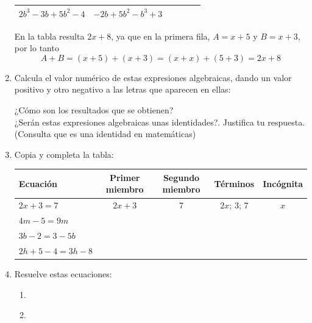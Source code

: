 \documentclass[10pt,twoside]{article}
\begin{document}
\begin{enumerate}
\begin{center}
\begin{tabular}{|l|l|c|c|c|c|}
\hline 
$2b^{3}-3b+5b^{2}-4$ & $-2b+5b^{2}-b^{3}+3$ &  &  &  &  \\ 
\hline 
\end{tabular} 
\end{center}
En la tabla resulta $2x+8$, ya que en la primera fila, $A=x+5$ y $B=x+3$, por lo tanto \[A+B=(x+5)+(x+3)=(x+x)+(5+3)=2x+8\]
\item Calcula el valor numérico de estas expresiones algebraicas, dando un valor positivo y otro negativo a las letras que aparecen en ellas:
\begin{enumerate}
\end{enumerate}
¿Cómo son los resultados que se obtienen?\\
¿Serán estas expresiones algebraicas unas identidades?. Justifica tu respuesta. (Consulta que es una identidad en matemáticas)
\item Copia y completa la tabla:
\begin{center}
\begin{tabular}{|l|c|c|c|c|}
\hline 
\hspace*{0.5cm} Ecuación & Primer miembro & Segundo miembro & Términos & Incógnita \\ 
\hline 
$2x+3=7$ & $2x+3$ & 7 & $2x$; \quad $3$; \quad $7$& $x$  \\ 
\hline 
$4m-5=9m$ &  &  &  &  \\ 
\hline 
$3b-2=3-5b$ &  &  &  &  \\ 
\hline 
$2h+5-4=3h-8$ &  &  &  &  \\ 
\hline 
\end{tabular} 
\end{center}
\item Resuelve estas ecuaciones:
\begin{enumerate}
\item 
\begin{enumerate}
\end{enumerate}
\item
\begin{enumerate}

\end{enumerate}
\end{enumerate}
\end{enumerate}
\end{document}
